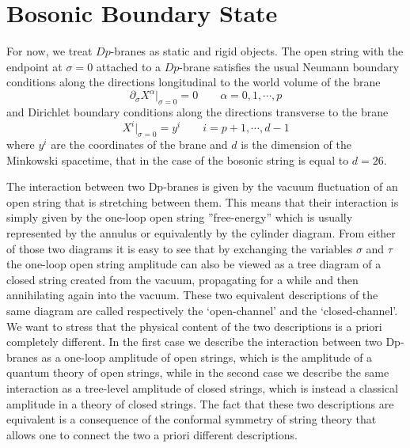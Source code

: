 \section{Bosonic Boundary State}
For now, we treat $Dp$-branes as static and rigid objects. The open string with the endpoint at $\sigma = 0$ attached to a $Dp$-brane
satisfies the usual Neumann boundary conditions along the directions longitudinal
to the world volume of the brane
\begin{equation}
	\partial_\sigma X^\alpha\vert_{\sigma=0}=0\quad\quad \alpha = 0,1,\cdots,p
	\label{eq:conditions}
\end{equation}
and Dirichlet boundary conditions along the directions transverse to the brane
\begin{equation}
	X^i\vert_{\sigma=0} = y^i\quad\quad i = p+1,\cdots,d-1
\end{equation}
where $y^i$ are the coordinates of the brane and $d$ is the dimension of the Minkowski spacetime, that in the case of the bosonic string is equal to $d=26$.
\par The interaction between two Dp-branes is given
by the vacuum fluctuation of an open string that is stretching between
them. This means that their interaction is simply given by the one-loop open string ”free-energy” which is usually represented by the annulus or
equivalently by the cylinder diagram. From either of those two diagrams it
is easy to see that by exchanging the variables $\sigma$ and $\tau$ the one-loop open
string amplitude can also be viewed as a tree diagram of a closed string
created from the vacuum, propagating for a while and then annihilating
again into the vacuum. These two equivalent descriptions of the same diagram
are called respectively the ‘open-channel’ and the ‘closed-channel’.
We want to stress that the physical content of the two descriptions is a
priori completely different. In the first case we describe the interaction between
two Dp-branes as a one-loop amplitude of open strings, which is the
amplitude of a quantum theory of open strings, while in the second case
we describe the same interaction as a tree-level amplitude of closed strings,
which is instead a classical amplitude in a theory of closed strings. The fact
that these two descriptions are equivalent is a consequence of the conformal
symmetry of string theory that allows one to connect the two a priori
different descriptions.
